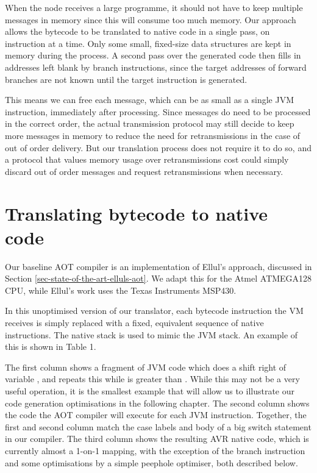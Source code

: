 When the node receives a large programme, it should not have to keep multiple messages in memory since this will consume too much memory. Our approach allows the bytecode to be translated to native code in a single pass, on instruction at a time. Only some small, fixed-size data structures are kept in memory during the process. A second pass over the generated code then fills in addresses left blank by branch instructions, since the target addresses of forward branches are not known until the target instruction is generated.

This means we can free each message, which can be as small as a single JVM instruction, immediately after processing. Since messages do need to be processed in the correct order, the actual transmission protocol may still decide to keep more messages in memory to reduce the need for retransmissions in the case of out of order delivery. But our translation process does not require it to do so, and a protocol that values memory usage over retransmissions cost could simply discard out of order messages and request retransmissions when necessary.


\section{Translating bytecode to native code}
\label{sec-basic-translation}
Our baseline AOT compiler is an implementation of Ellul's approach, discussed in Section \ref{sec-state-of-the-art-elluls-aot}. We adapt this for the Atmel ATMEGA128 CPU, while Ellul's work uses the Texas Instruments MSP430. 

In this unoptimised version of our translator, each bytecode instruction the VM receives is simply replaced with a fixed, equivalent sequence of native instructions. The native stack is used to mimic the JVM stack. An example of this is shown in Table 1.

The first column shows a fragment of JVM code which does a shift right of variable , and repeats this while  is greater than . While this may not be a very useful operation, it is the smallest example that will allow us to illustrate our code generation optimisations in the following chapter. The second column shows the code the AOT compiler will execute for each JVM instruction. Together, the first and second column match the case labels and body of a big switch statement in our compiler. The third column shows the resulting AVR native code, which is currently almost a 1-on-1 mapping, with the exception of the branch instruction and some optimisations by a simple peephole optimiser, both described below.

